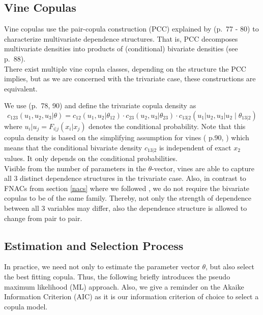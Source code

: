 \documentclass[
]{krantz}
\begin{document}
\subsection{Vine Copulas}\label{vines}

Vine copulas use the pair-copula construction (PCC) explained by \citet{czado2019} (p.~77 - 80) to characterize
multivariate dependence structures.
That is, PCC decomposes multivariate densities into products of (conditional) bivariate densities (see \citet{czado2019} p.~88).\\
There exist multiple vine copula classes, depending on the structure the PCC implies, but as we are concerned with the trivariate case,
these constructions are equivalent.

We use \citet{czado2019} (p.~78, 90) and define the trivariate copula density as
\[
c_{123}(u_1, u_2, u_3|\theta) = c_{12}(u_1, u_2|\theta_{12}) \cdot  c_{23}(u_2, u_3|\theta_{23})  \cdot c_{13|2}(u_1|u_2, u_3|u_2\mid \theta_{13|2})
\label{eq:simpvinecopdf}
\]
where \(u_i|u_j = F_{i|j}(x_i|x_j)\) denotes the conditional probability.
Note that this copula density is based on the simplifying assumption for vines (\citet{czado2019} p.90, \citet{nagler2018}) which means
that the conditional bivariate density \(c_{13|2}\) is independent of exact \(x_2\) values.
It only depends on the conditional probabilities.\\
Visible from the number of parameters in the \(\theta\)-vector, vines are able to capture all \(3\) distinct
dependence structures in the trivariate case.
Also, in contrast to FNACs from section \ref{nacs} where we followed \citet{grimaldi2006}, we do not require the bivariate copulas to be of the same family. Thereby,
not only the strength of dependence between all \(3\) variables may differ, also
the dependence structure is allowed to change from pair to pair.

\subsection{Estimation and Selection Process}\label{est}

In practice, we need not only to estimate the parameter vector \(\theta\), but also select the best fitting copula.
Thus, the following briefly introduces the pseudo maximum likelihood (ML) approach.
Also, we give a reminder on the Akaike Information Criterion (AIC) as it is our information criterion of choice to select a copula model.
\end{document}
